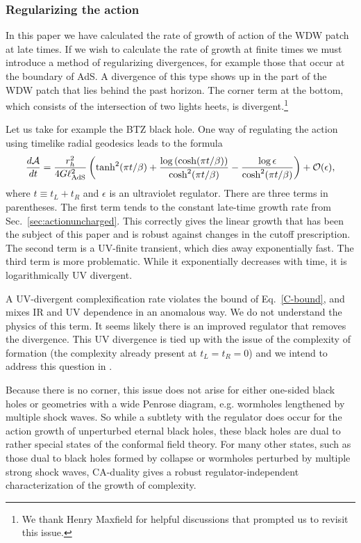 \documentclass[12pt]{article}
\numberwithin{equation}{section}
\def\CA{{\cal A}}
\newcommand{\lads}{\ell_{\text{AdS}}}
\begin{document}
\subsubsection{Regularizing the action} \label{sec:corner}

In this paper we have calculated the rate of growth of action of the WDW patch at late times. If we wish to calculate the rate of growth at finite times we must introduce a method of regularizing divergences, for example those that occur at the boundary of AdS. A divergence of this type shows up in the part of the WDW patch that lies behind the past horizon. The corner term at the bottom, which consists of the intersection of two lights heets, is divergent.\footnote{We thank Henry Maxfield for helpful discussions that prompted us to revisit this issue.}



Let us take for example the BTZ black hole. One way of regulating the action using timelike radial geodesics leads to the formula
\begin{equation}
\begin{aligned}
\frac{d\CA}{dt}=\frac{r_h^2}{4G\lads^2}\left(\tanh^2(\pi t/\beta)+\frac{\log\left(\cosh(\pi t/\beta)\right)}{\cosh^2(\pi t/\beta)} - \frac{\log\epsilon}{\cosh^2(\pi t/\beta)}\right)+\mathcal{O}(\epsilon),
\end{aligned}
\end{equation}
where $t \equiv t_L + t_R$ and $\epsilon$ is an ultraviolet regulator. There are three terms in parentheses.
The first term  tends to the constant late-time growth rate from Sec.~\ref{sec:actionuncharged}. This correctly gives the linear growth that has been the subject of this paper and is robust against changes in the cutoff prescription. The second term is a UV-finite transient, which dies away exponentially fast. The third term is more problematic. While it exponentially decreases with time, it is logarithmically UV divergent.
%
%
%

A UV-divergent complexification rate violates the bound of Eq.~\ref{C-bound}, and mixes IR and UV dependence in an anomalous way. We do not understand the physics of this term. It seems likely there is an improved regulator that removes the divergence. This UV divergence is  tied up with the issue of the complexity of formation (the complexity already present at $t_L=t_R=0$) and we intend to address  this question in \cite{ToAppear}.

Because there is no corner, this issue does not arise for either one-sided black holes or geometries with a wide Penrose diagram, e.g. wormholes lengthened by multiple shock waves. So while a subtlety with the regulator does occur for the action growth of unperturbed eternal black holes, these black holes are dual to rather special states of the conformal field theory. For many other states, such as those dual to black holes formed by collapse or wormholes perturbed by multiple strong shock waves, CA-duality gives a robust regulator-independent characterization of the growth of complexity.
\end{document}
